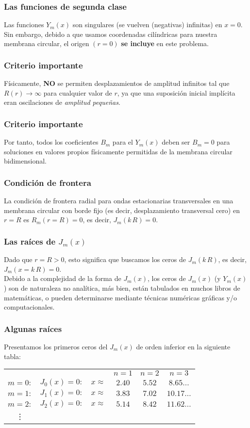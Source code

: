 \documentclass[12pt]{beamer}
\begin{document}
\begin{frame}
\frametitle{Las funciones de segunda clase}
Las funciones $Y_{m} (x)$ son singulares (se vuelven (negativas) infinitas) en $x = 0$.
\\
\bigskip
\pause
Sin embargo, debido a que usamos coordenadas cilíndricas para nuestra membrana circular, el origen $(r = 0)$ \textbf{se incluye} en este problema.
\end{frame}
\begin{frame}
\frametitle{Criterio importante}
Físicamente, \textbf{NO} se permiten desplazamientos de amplitud infinitos tal que $R(r) \to \infty$ para cualquier valor de $r$, ya que una suposición inicial implícita eran oscilaciones de \emph{amplitud pequeñas}. 
\end{frame}
\begin{frame}
\frametitle{Criterio importante}
Por tanto, todos los coeficientes $B_{m}$ para el $Y_{m} (x)$ deben ser $B_{m} = 0$ para soluciones en valores propios físicamente permitidas de la membrana circular bidimensional.
\end{frame}
\begin{frame}
\frametitle{Condición de frontera}
La condición de frontera radial para ondas estacionarias transversales en una membrana circular con borde fijo (es decir, desplazamiento transversal cero) en $r = R$ es $R_{m} (r = R) = 0$, \pause es decir, $J_{m} (k \, R) = 0$.
\end{frame}
\begin{frame}
\frametitle{Las raíces de $J_{m}(x)$}
Dado que $r = R > 0$, esto significa que buscamos los ceros de $J_{m} (k \, R)$, es decir, $J_{m} (x = k \,R) = 0$.
\\
\bigskip
\pause
Debido a la complejidad de la forma de $J_{m} (x)$, los ceros de $J_{m} (x)$ (y $Y_{m} (x)$) son de naturaleza no analítica, más bien, están tabulados en muchos libros de matemáticas, o pueden determinarse mediante técnicas numéricas gráficas y/o computacionales.
\end{frame}
\begin{frame}
\frametitle{Algunas raíces}
Presentamos los primeros ceros del $J_{m} (x)$ de orden inferior en la siguiente tabla:
\fontsize{12}{12}\selectfont
\begin{table}[H]
\centering
\begin{tabular}{c c c c c c}
    & & & $n=1$ & $n=2$ & $n=3$ \\
$m=0:$ & $J_{0}(x)=0:$ & $x \approx$ & $2.40$ & $5.52$ & $8.65  \ldots$ \\
$m=1:$ & $J_{1}(x)=0:$ & $x \approx$ & $3.83$ & $7.02$ & $10.17 \ldots$ \\
$m=2:$ & $J_{2}(x)=0:$ & $x \approx$ & $5.14$ & $8.42$ & $11.62 \ldots$ \\
\vdots
\end{tabular}
\end{table}
\end{frame}
\end{document}
